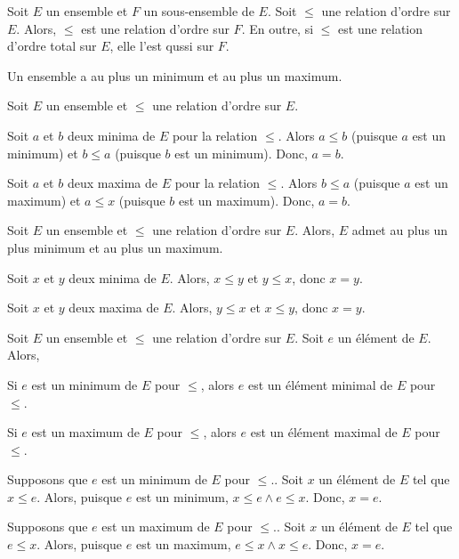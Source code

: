 \blank[medium]

\noindent{} Soit $E$ un ensemble et $F$ un sous-ensemble de $E$.
    Soit $\leq$ une relation d'ordre sur $E$.
    Alors, $\leq$ est une relation d'ordre sur $F$.
    En outre, si $\leq$ est une relation d'ordre total sur $E$, elle l'est qussi sur $F$.

\blank[medium]

\noindent{} Un ensemble a au plus un minimum et au plus un maximum. 

\blank[medium]

\noindent{} Soit $E$ un ensemble et $\leq$ une relation d'ordre sur $E$. 
\startitemize[nowhite]
    \item Soit $a$ et $b$ deux minima de $E$ pour la relation $\leq$. 
        Alors $a \leq b$ (puisque $a$ est un minimum) et $b \leq a$ (puisque $b$ est un minimum).
        Donc, $a = b$.
    \item Soit $a$ et $b$ deux maxima de $E$ pour la relation $\leq$. 
        Alors $b \leq a$ (puisque $a$ est un maximum) et $a \leq x$ (puisque $b$ est un maximum).
        Donc, $a = b$.
\stopitemize

\done

\blank[medium]

\noindent{} Soit $E$ un ensemble et $\leq$ une relation d'ordre sur $E$. 
    Alors, $E$ admet au plus un plus minimum et au plus un maximum. 

\blank[medium]

\noindent{} 
    Soit $x$ et $y$ deux minima de $E$. 
    Alors, $x \leq y$ et $y \leq x$, donc $x = y$.
    
    Soit $x$ et $y$ deux maxima de $E$. 
    Alors, $y \leq x$ et $x \leq y$, donc $x = y$.

    \done

\blank[medium]

\noindent{} Soit $E$ un ensemble et $\leq$ une relation d'ordre sur $E$. 
    Soit $e$ un élément de $E$. 
    Alors, 
    \startitemize
        \item Si $e$ est un minimum de $E$ pour $\leq$, alors $e$ est un élément minimal de $E$ pour $\leq$.
        \item Si $e$ est un maximum de $E$ pour $\leq$, alors $e$ est un élément maximal de $E$ pour $\leq$.
    \stopitemize

\blank[medium]

\noindent{} 
    \startitemize
        \item Supposons que $e$ est un minimum de $E$ pour $\leq$..
            Soit $x$ un élément de $E$ tel que $x \leq e$.
            Alors, puisque $e$ est un minimum, $x \leq e \wedge e \leq x$.
            Donc, $x = e$.
        \item Supposons que $e$ est un maximum de $E$ pour $\leq$..
            Soit $x$ un élément de $E$ tel que $e \leq x$.
            Alors, puisque $e$ est un maximum, $e \leq x \wedge x \leq e$.
            Donc, $x = e$.
    \stopitemize

